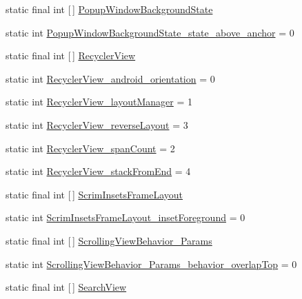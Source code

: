\begin{DoxyCompactItemize}
static final int \mbox{[}$\,$\mbox{]} \hyperlink{classandroid_1_1support_1_1v4_1_1R_1_1styleable_a20b84169baa4a240ced79c4184411680}{Popup\+Window\+Background\+State}
\item 
static int \hyperlink{classandroid_1_1support_1_1v4_1_1R_1_1styleable_aa2ce1f64d9e7308599d8ec1ae0bb9d70}{Popup\+Window\+Background\+State\+\_\+state\+\_\+above\+\_\+anchor} = 0
\item 
static final int \mbox{[}$\,$\mbox{]} \hyperlink{classandroid_1_1support_1_1v4_1_1R_1_1styleable_ad60a429c2c839e07a58e4212d7ffeba0}{Recycler\+View}
\item 
static int \hyperlink{classandroid_1_1support_1_1v4_1_1R_1_1styleable_a45d2052c430de024aae5de8cf614d894}{Recycler\+View\+\_\+android\+\_\+orientation} = 0
\item 
static int \hyperlink{classandroid_1_1support_1_1v4_1_1R_1_1styleable_ab6b6c3ab74ca094457a85f1e6996a730}{Recycler\+View\+\_\+layout\+Manager} = 1
\item 
static int \hyperlink{classandroid_1_1support_1_1v4_1_1R_1_1styleable_a0af7d1bacde2568fa5bbd69fe6f3261e}{Recycler\+View\+\_\+reverse\+Layout} = 3
\item 
static int \hyperlink{classandroid_1_1support_1_1v4_1_1R_1_1styleable_a2fc5b4b990851afc287e7ab8f60f18f8}{Recycler\+View\+\_\+span\+Count} = 2
\item 
static int \hyperlink{classandroid_1_1support_1_1v4_1_1R_1_1styleable_ab104a582751ed1c1f7370efc87b2d64b}{Recycler\+View\+\_\+stack\+From\+End} = 4
\item 
static final int \mbox{[}$\,$\mbox{]} \hyperlink{classandroid_1_1support_1_1v4_1_1R_1_1styleable_a7e7d8d13fae500e42bc330c6a6214a98}{Scrim\+Insets\+Frame\+Layout}
\item 
static int \hyperlink{classandroid_1_1support_1_1v4_1_1R_1_1styleable_a9d6928d3605fb3a5348e3c0b8738c6bc}{Scrim\+Insets\+Frame\+Layout\+\_\+inset\+Foreground} = 0
\item 
static final int \mbox{[}$\,$\mbox{]} \hyperlink{classandroid_1_1support_1_1v4_1_1R_1_1styleable_a6d0733db2ccefc6d9526c8cfa4b29ea2}{Scrolling\+View\+Behavior\+\_\+\+Params}
\item 
static int \hyperlink{classandroid_1_1support_1_1v4_1_1R_1_1styleable_aa15db50a988307d32a8d9f28a43f14aa}{Scrolling\+View\+Behavior\+\_\+\+Params\+\_\+behavior\+\_\+overlap\+Top} = 0
\item 
static final int \mbox{[}$\,$\mbox{]} \hyperlink{classandroid_1_1support_1_1v4_1_1R_1_1styleable_a7f709410d566e9fd5d4c710e815c300a}{Search\+View}

\end{DoxyCompactItemize}
